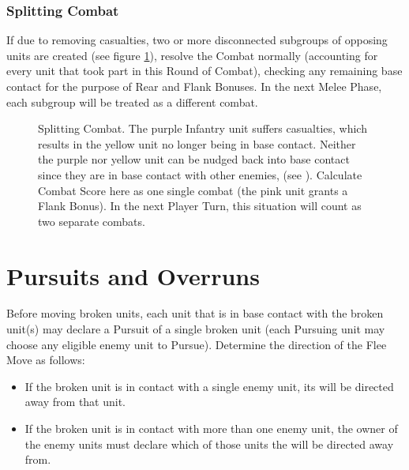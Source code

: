 \subsubsection{Splitting Combat}
\label{splitting_combat}

If due to removing casualties, two or more disconnected subgroups of opposing units are created (see figure \ref{figure/splitting_combat}), resolve the Combat normally (accounting for every unit that took part in this Round of Combat), checking any remaining base contact for the purpose of Rear and Flank Bonuses. In the next Melee Phase, each subgroup will be treated as a different combat.

\newcommand{\figSplitA}{a)}
\newcommand{\figSplitB}{b)}

\begin{figure}[!htbp]
\centering
\def\svgwidth{0.7\textwidth}

\caption{Splitting Combat.\captionpar
The purple Infantry unit suffers casualties, which results in the yellow unit no longer being in base contact. Neither the purple nor yellow unit can be nudged back into base contact since they are in base contact with other enemies, (see ). Calculate Combat Score here as one single combat (the pink unit grants a Flank Bonus). In the next Player Turn, this situation will count as two separate combats.}
\label{figure/splitting_combat}
\end{figure} 

\section{Pursuits and Overruns}
\label{pursuits_and_overruns}

Before moving broken units, each unit that is in base contact with the broken unit(s) may declare a Pursuit of a single broken unit (each Pursuing unit may choose any eligible enemy unit to Pursue). Determine the direction of the Flee Move as follows:
\begin{itemize}[label={-}]
\item If the broken unit is in contact with a single enemy unit, its  will be directed away from that unit.
\item If the broken unit is in contact with more than one enemy unit, the owner of the enemy units must declare which of those units the  will be directed away from.
\end{itemize}

